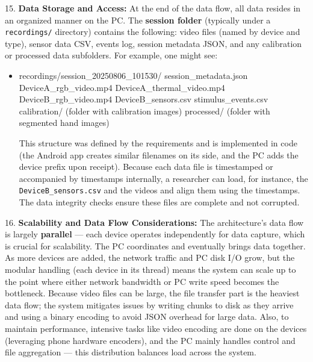 15. \textbf{Data Storage and Access:} At the end of the data flow, all data
    resides in an organized manner on the PC. The \textbf{session folder}
    (typically under a \texttt{recordings/} directory) contains the following:
    video files (named by device and type), sensor data CSV, events log,
    session metadata JSON, and any calibration or processed data
    subfolders. For example, one might see:

\begin{itemize}
\item recordings/session_20250806_101530/
        session_metadata.json
        DeviceA_rgb_video.mp4
        DeviceA_thermal_video.mp4
        DeviceB_rgb_video.mp4
        DeviceB_sensors.csv
        stimulus_events.csv
        calibration/ (folder with calibration images)
        processed/ (folder with segmented hand images)

  This structure was defined by the requirements and is implemented in
  code (the Android app creates similar filenames on its
  side\cite{SessionManagerKt},
  and the PC adds the device prefix upon receipt). Because each data
  file is timestamped or accompanied by timestamps internally, a
  researcher can load, for instance, the \texttt{DeviceB_sensors.csv} and the
  videos and align them using the timestamps. The data integrity checks
  ensure these files are complete and not corrupted.

\end{itemize}
16. \textbf{Scalability and Data Flow Considerations:} The architecture's
    data flow is largely \textbf{parallel} --- each device operates
    independently for data capture, which is crucial for scalability.
    The PC coordinates and eventually brings data together. As more
    devices are added, the network traffic and PC disk I/O grow, but the
    modular handling (each device in its thread) means the system can
    scale up to the point where either network bandwidth or PC write
    speed becomes the bottleneck. Because video files can be large, the
    file transfer part is the heaviest data flow; the system mitigates
    issues by writing chunks to disk as they arrive and using a binary
    encoding to avoid JSON overhead for large
    data\cite{DeviceServer}.
    Also, to maintain performance, intensive tasks like video encoding
    are done on the devices (leveraging phone hardware encoders), and
    the PC mainly handles control and file aggregation --- this
    distribution balances load across the system.

